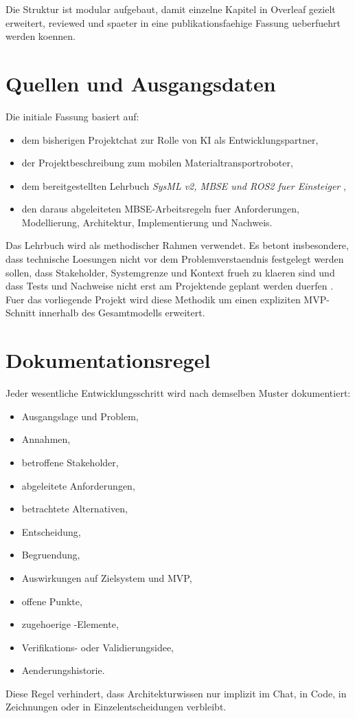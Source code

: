 Die Struktur ist modular aufgebaut, damit einzelne Kapitel in Overleaf gezielt erweitert, reviewed und spaeter in eine publikationsfaehige Fassung ueberfuehrt werden koennen.

\section{Quellen und Ausgangsdaten}

Die initiale Fassung basiert auf:
\begin{itemize}
  \item dem bisherigen Projektchat zur Rolle von KI als Entwicklungspartner,
  \item der Projektbeschreibung zum mobilen Materialtransportroboter,
  \item dem bereitgestellten Lehrbuch \emph{SysML v2, MBSE und ROS2 fuer Einsteiger} \cite{becker2026sysml},
  \item den daraus abgeleiteten MBSE-Arbeitsregeln fuer Anforderungen, Modellierung, Architektur, Implementierung und Nachweis.
\end{itemize}

Das Lehrbuch wird als methodischer Rahmen verwendet. Es betont insbesondere, dass technische Loesungen nicht vor dem Problemverstaendnis festgelegt werden sollen, dass Stakeholder, Systemgrenze und Kontext frueh zu klaeren sind und dass Tests und Nachweise nicht erst am Projektende geplant werden duerfen \cite[Kap.~1]{becker2026sysml}. Fuer das vorliegende Projekt wird diese Methodik um einen expliziten MVP-Schnitt innerhalb des Gesamtmodells erweitert.

\section{Dokumentationsregel}

Jeder wesentliche Entwicklungsschritt wird nach demselben Muster dokumentiert:
\begin{itemize}
  \item Ausgangslage und Problem,
  \item Annahmen,
  \item betroffene Stakeholder,
  \item abgeleitete Anforderungen,
  \item betrachtete Alternativen,
  \item Entscheidung,
  \item Begruendung,
  \item Auswirkungen auf Zielsystem und MVP,
  \item offene Punkte,
  \item zugehoerige \sysml-Elemente,
  \item Verifikations- oder Validierungsidee,
  \item Aenderungshistorie.
\end{itemize}

Diese Regel verhindert, dass Architekturwissen nur implizit im Chat, in Code, in Zeichnungen oder in Einzelentscheidungen verbleibt.
